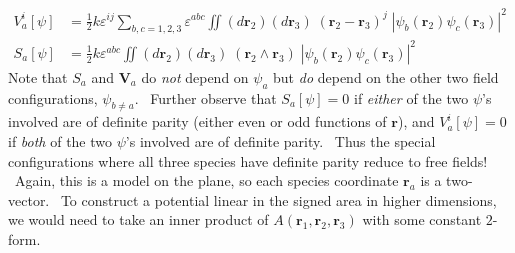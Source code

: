 \documentclass[a4paper,12pt]{article}%
\begin{document}
\begin{align*}
V_{a}^{i}\left[  \psi\right]   &  =\tfrac{1}{2}k\varepsilon^{ij}%
\sum_{b,c=1,2,3}\varepsilon^{abc}\iint\left(  d\mathbf{r}_{2}\right)  \left(
d\mathbf{r}_{3}\right)  \;\left(  \mathbf{r}_{2}-\mathbf{r}_{3}\right)
^{j}\;\left|  \psi_{b}\left(  \mathbf{r}_{2}\right)  \psi_{c}\left(
\mathbf{r}_{3}\right)  \right|  ^{2}\\
S_{a}\left[  \psi\right]   &  =\tfrac{1}{2}k\varepsilon^{abc}\iint\left(
d\mathbf{r}_{2}\right)  \left(  d\mathbf{r}_{3}\right)  \;\left(
\mathbf{r}_{2}\wedge\mathbf{r}_{3}\right)  \;\left|  \psi_{b}\left(
\mathbf{r}_{2}\right)  \psi_{c}\left(  \mathbf{r}_{3}\right)  \right|  ^{2}%
\end{align*}
Note that $S_{a}$ and $\mathbf{V}_{a}$ do \emph{not} depend on $\psi_{a}$ but
\emph{do} depend on the other two field configurations, $\psi_{b\neq a}$.
\ Further observe that $S_{a}\left[  \psi\right]  =0$ if \emph{either} of the
two $\psi$'s involved are of definite parity (either even or odd functions of
$\mathbf{r}$), and $V_{a}^{i}\left[  \psi\right]  =0$ if \emph{both} of the
two $\psi$'s involved are of definite parity. \ Thus the special
configurations where all three species have definite parity reduce to free
fields! \ Again, this is a model on the plane, so each species coordinate
$\mathbf{r}_{a}$ is a two-vector. \ To construct a potential linear in the
signed area in higher dimensions, we would need to take an inner product of
$A\left(  \mathbf{r}_{1},\mathbf{r}_{2},\mathbf{r}_{3}\right)  $ with some
constant $2$-form.
\end{document}
